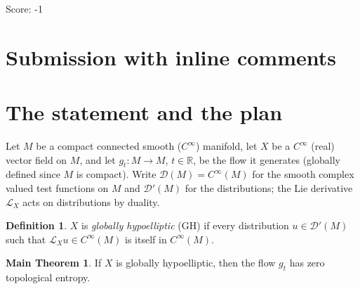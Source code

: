 \documentclass[11pt]{article}
\theoremstyle{definition}
\newtheorem{definition}[theorem]{Definition}
\newtheorem*{mainthm}{Main Theorem}
\newcommand{\calL}{\mathcal{L}}
\newcommand{\RR}{\mathbb{R}}
\begin{document}
\noindent Score: -1



\newpage
\section{Submission with inline comments}


\section{The statement and the plan}\label{sec:intro}

Let $M$ be a compact connected smooth ($C^\infty$) manifold, let $X$ be a
$C^\infty$ (real) vector field on $M$, and let $g_t : M \to M$,
$t \in \RR$, be the flow it generates (globally defined since $M$ is
compact). Write $\mathcal{D}(M) = C^\infty(M)$ for the smooth complex
valued test functions on $M$ and $\mathcal{D}'(M)$ for the distributions;
the Lie derivative $\calL_X$ acts on distributions by duality.

\begin{definition}\label{def:GH}
$X$ is \emph{globally hypoelliptic} (GH) if every distribution
$u \in \mathcal{D}'(M)$ such that $\calL_X u \in C^\infty(M)$ is itself in
$C^\infty(M)$.
\end{definition}

\begin{mainthm}
If $X$ is globally hypoelliptic, then the flow $g_t$ has zero topological
entropy.
\end{mainthm}
\end{document}
